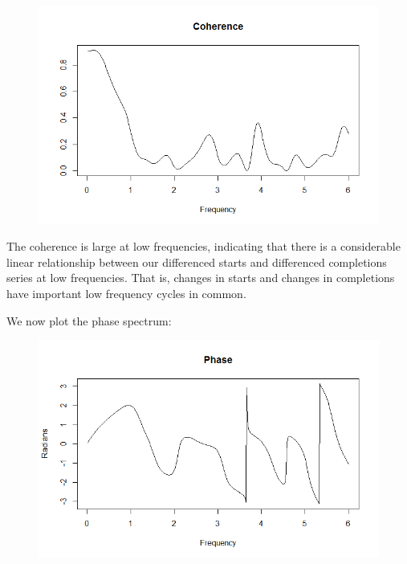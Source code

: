 \documentclass[12pt]{article} %
\begin{document}
\begin{figure}[H]
\begin{center}
\includegraphics[scale=0.55]{coherence_spectrum}
\caption{}
\end{center}
\end{figure}

The coherence is large at low frequencies, indicating that there is a considerable linear relationship between our differenced starts and differenced completions series at low frequencies. That is, changes in starts and changes in completions have important low frequency cycles in common.

We now plot the phase spectrum:

\begin{figure}[H]
\begin{center}
\includegraphics[scale=0.55]{phase_spectrum}
\caption{}
\end{center}
\end{figure}
\end{document}
